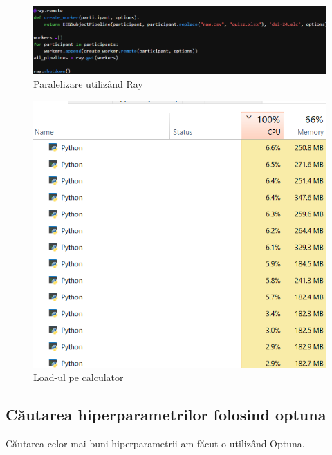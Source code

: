 \setlength{\abovecaptionskip}{0pt}
\setlength{\belowcaptionskip}{0pt}
\clearpage
\begin{figure}[!h]
    \centering
    \includegraphics[width=1\linewidth]{images/ray.png}
    \caption{Paralelizare utilizând Ray}
    \label{fig:enter-label}
\end{figure}

\begin{figure}[h]
    \centering
    \includegraphics[width=0.7\linewidth]{task_manager.png}
    \caption{Load-ul pe calculator}
    \label{fig:enter-label}
\end{figure}

\subsection{Căutarea hiperparametrilor folosind optuna}

Căutarea celor mai buni hiperparametrii am făcut-o utilizând Optuna\cite{optuna_2019}. 